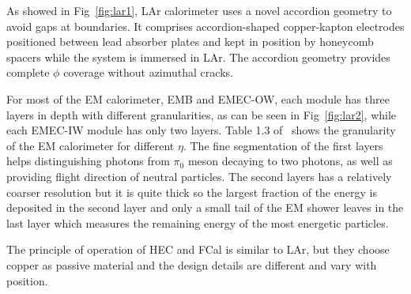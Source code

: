\par As showed in Fig~\ref{fig:lar1}, LAr calorimeter uses a novel accordion geometry to avoid gaps at boundaries. It comprises accordion-shaped 
copper-kapton electrodes positioned between lead absorber plates and kept in position by honeycomb spacers while the system is immersed in LAr. 
The accordion geometry provides complete $\phi$ coverage without azimuthal cracks.
\par For most of the EM calorimeter, EMB and EMEC-OW, each module has three layers in depth with different granularities, 
as can be seen in Fig~\ref{fig:lar2}, while each EMEC-IW module has only two layers. Table 1.3 of~\cite{Aad:1129811} 
shows the granularity of the EM calorimeter for different $\eta$. 
The fine segmentation of the first layers helps distinguishing photons from $\pi_0$ 
meson decaying to two photons, as well as providing flight direction of neutral particles. The second layers has a relatively
coarser resolution but it is quite thick so the largest fraction of the energy is deposited in the second layer and only a small tail of the EM shower 
leaves in the last layer which measures the remaining energy of the most energetic particles.

\par The principle of operation of HEC and FCal is similar to LAr, but they choose copper as passive material and the design details are different and vary with position.



